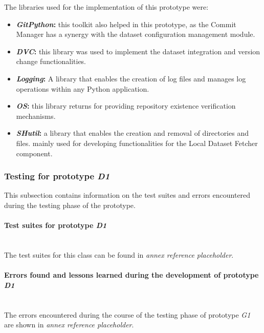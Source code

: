 The libraries used for the implementation of this prototype were:

\begin{itemize}
    \item \textbf{\emph{GitPython}: }this toolkit also helped in this prototype, as the Commit Manager has a synergy with the dataset configuration management module.
    \item \textbf{\emph{DVC}: }this library was used to implement the dataset integration and version change functionalities.
    \item \textbf{\emph{Logging}: }A library that enables the creation of log files and manages log operations within any Python application.
    \item \textbf{\emph{OS}: }this library returns for providing repository existence verification mechanisms.
    \item \textbf{\emph{SHutil}: }a library that enables the creation and removal of directories and files. mainly used for developing functionalities for the Local Dataset Fetcher component.
\end{itemize}

\subsubsection{Testing for prototype \emph{D1}}

This subsection contains information on the test suites and errors encountered during the testing phase of the prototype.

\paragraph{Test suites for prototype \emph{D1}}\mbox{}\\

The test suites for this class can be found in \emph{annex reference placeholder}. %

\paragraph{Errors found and lessons learned during the development of prototype \emph{D1}}\mbox{}\\

The errors encountered during the course of the testing phase of prototype \emph{G1} are shown in \emph{annex reference placeholder}. %

